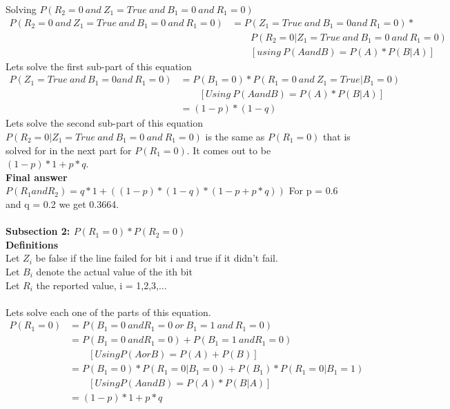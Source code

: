 \documentclass[12pt]{article}
\begin{document}
Solving $P(R_2 = 0\ and\ Z_1 = True\ and\  B_1 = 0\ and\ R_1 = 0) $ \\
\begin{align}
P(R_2 = 0\ and\ Z_1 = True\ and\  B_1 = 0\ and\ R_1 = 0)  & = P(Z_1 = True\ and\  B_1 = 0 and\ R_1 = 0) * \nonumber \\
& \qquad P( R_2 = 0| Z_1 = True\ and\  B_1 = 0\ and\ R_1 = 0) \nonumber \\
& \qquad[using\ P(A and B) = P(A) * P(B|A)] \nonumber
\end{align}
Lets solve the first sub-part of this equation\\
\begin{align}
P(Z_1 = True\ and\  B_1 = 0 and\ R_1 = 0) & = P(B_1 = 0) * P(R_1 = 0\ and\ Z_1 = True | B_1 = 0 ) \nonumber \\
& \qquad [Using\ P(A and B) = P(A) * P(B|A) ] \nonumber \\
& = (1-p) * (1-q) \nonumber
\end{align}
Lets solve the second sub-part of this equation\\
$P( R_2 = 0| Z_1 = True\ and\  B_1 = 0\ and\ R_1 = 0)$ is the same as $P(R_1 = 0)$ that is solved for in the next part for $P(R_1 = 0)$. It comes out to be $(1-p)*1 + p*q$.\\
\textbf{Final answer}\\
$P(R_1 and R_2) = q*1+  ((1-p)*(1-q)*(1-p+p*q)) $
For p = 0.6 and q = 0.2 we get 0.3664.\\\\
\textbf{Subsection 2: $P(R_1 = 0) * P( R_2 = 0)$ }\\
\textbf{Definitions}\\
Let $Z_i$ be false if the line failed for bit i and true if it didn't fail.\\
Let $B_i$ denote the actual value of the ith bit \\
Let  $R_i$ the reported value, i = 1,2,3,...\\\\
Lets solve each one of the parts of this equation.
\begin{align}
P(R_1 = 0) & = P(B_1 = 0\ and R_1 = 0\ or\ B_1 = 1\ and\ R_1 = 0)\ \nonumber\\
& = P(B_1 = 0\ and R_1 = 0) + P(B_1 = 1\ and R_1 = 0) \nonumber \\
& \qquad [Using P(A or B) = P(A) + P(B)] \nonumber \\
& = P(B_1 = 0)*P(R_1 = 0 | B_1 = 0) + P(B_1) * P(R_1 = 0 |B_1 = 1 ) \nonumber \\
& \qquad [Using P(A and B) = P(A) * P(B|A)] \nonumber \\
& = (1-p)*1 + p*q \nonumber
\end{align}
\end{document}
